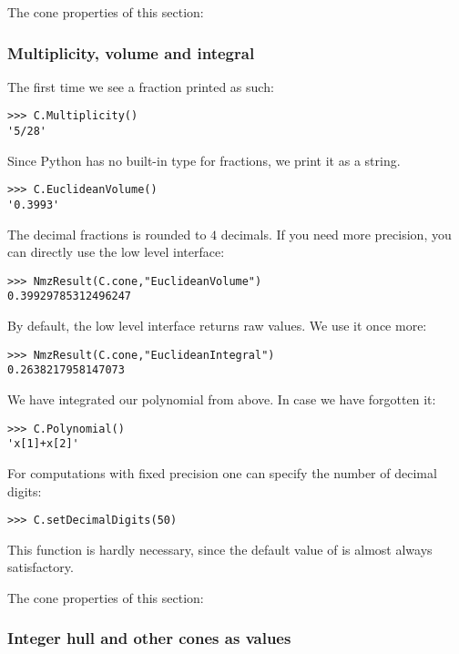 \begin{small}
The cone properties of this section: 

\subsubsection{Multiplicity, volume and integral}
The first time we see a fraction printed as such:
\begin{Verbatim}
>>> C.Multiplicity()
'5/28'
\end{Verbatim}
Since Python has no built-in type for fractions, we print it as a string.

\begin{Verbatim}
>>> C.EuclideanVolume()
'0.3993'
\end{Verbatim}
The decimal fractions is rounded to $4$ decimals. If you need more precision, you can directly use the low level interface:
\begin{Verbatim}
>>> NmzResult(C.cone,"EuclideanVolume")
0.39929785312496247
\end{Verbatim}
By default, the low level interface returns raw values. We use it once more:
\begin{Verbatim}
>>> NmzResult(C.cone,"EuclideanIntegral")
0.2638217958147073
\end{Verbatim}
We have integrated our polynomial from above. In case we have forgotten it:
\begin{Verbatim}
>>> C.Polynomial()
'x[1]+x[2]'
\end{Verbatim}

For computations with fixed precision one can specify the number of decimal digits:
\begin{Verbatim}
>>> C.setDecimalDigits(50)
\end{Verbatim}
This function is hardly necessary, since the default value of  is almost always satisfactory.

The cone properties of this section: 

\subsubsection{Integer hull and other cones as values}


\end{small}
